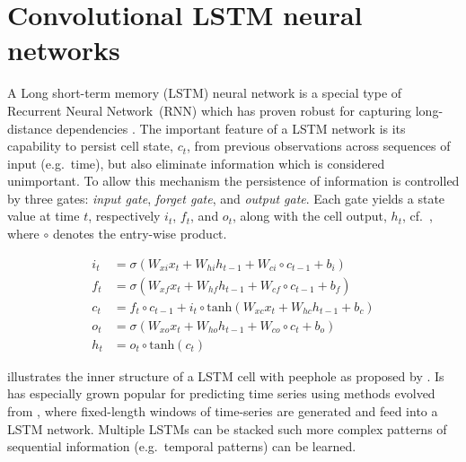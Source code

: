 \documentclass[preprint,11pt,5p,twocolumn]{elsarticle}
\begin{document}
\section{Convolutional LSTM neural networks}
\label{sec:convlstm}
A Long short-term memory (LSTM) neural network is a special type of Recurrent Neural Network~(RNN) which has proven robust for capturing long-distance dependencies \cite{Lstm1,Lstm2}. The important feature of a LSTM network is its capability to persist cell state, $c_t$, from previous observations across sequences of input (e.g.\ time), but also eliminate information which is considered unimportant. To allow this mechanism the persistence of information is controlled by three gates: \emph{input gate}, \emph{forget gate}, and \emph{output gate}. Each gate yields a state value at time $t$, respectively $i_t$, $f_t$, and $o_t$, along with the cell output, $h_t$, cf.\ , where $\circ$ denotes the entry-wise product.

\begin{equation}
\begin{aligned}
  i_t &= \sigma \left( W_\mathit{xi} x_t + W_\mathit{hi} h_{t-1} + W_{ci} \circ c_{t-1} + b_i \right) \\
  f_t &= \sigma \left( W_\mathit{xf} x_t + W_\mathit{hf} h_{t-1} + W_\mathit{cf} \circ c_{t-1} + b_f \right) \\
  c_t &= f_t \circ c_{t-1} + i_t \circ \mathrm{tanh} \left( W_\mathit{xc} x_t + W_\mathit{hc} h_{t-1} + b_c \right) \\
  o_t &= \sigma \left( W_\mathit{xo} x_t + W_\mathit{ho} h_{t-1} + W_\mathit{co} \circ c_{t} + b_o \right) \\
  h_t &= o_t \circ \mathrm{tanh} \left( c_t \right)
\end{aligned}
\label{eq:lstm}
\end{equation}
\vspace{.5em}

 illustrates the inner structure of a LSTM cell with peephole as proposed by \cite{LstmPeephole}. 
Is has especially grown popular for predicting time series using methods evolved from \cite{LstmTs}, where fixed-length windows of time-series are generated and feed into a LSTM network. Multiple LSTMs can be stacked such more complex patterns of sequential information (e.g.\ temporal patterns) can be learned.
\end{document}
